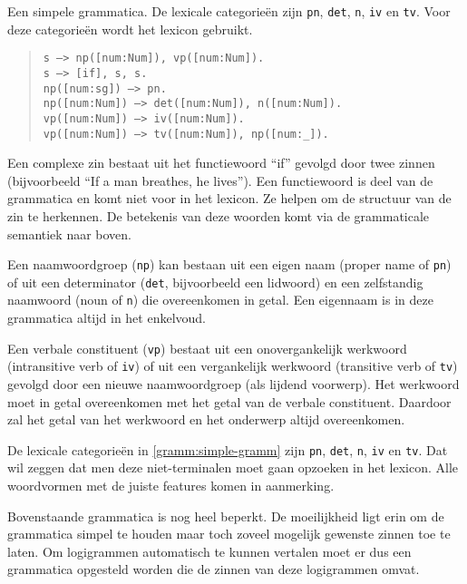 \begin{ex}
  Een simpele grammatica. De lexicale categorieën zijn \texttt{pn}, \texttt{det}, \texttt{n}, \texttt{iv} en \texttt{tv}. Voor deze categorieën wordt het lexicon gebruikt.
  \label{gramm:simple-gramm}
  \begin{quote}
    \texttt{s ---> np([num:Num]), vp([num:Num]).} \\
    \texttt{s ---> [if], s, s.} \\
    \texttt{np([num:sg]) ---> pn.} \\
    \texttt{np([num:Num]) ---> det([num:Num]), n([num:Num]).} \\
    \texttt{vp([num:Num]) ---> iv([num:Num]).} \\
    \texttt{vp([num:Num]) ---> tv([num:Num]), np([num:\_]).} \\
  \end{quote}
\end{ex} 

Een complexe zin bestaat uit het functiewoord ``if'' gevolgd door twee zinnen (bijvoorbeeld ``If a man breathes, he lives''). Een functiewoord is deel van de grammatica en komt niet voor in het lexicon. Ze helpen om de structuur van de zin te herkennen. De betekenis van deze woorden komt via de grammaticale semantiek naar boven.

Een naamwoordgroep (\texttt{np}) kan bestaan uit een eigen naam (proper name of \texttt{pn}) of uit een determinator (\texttt{det}, bijvoorbeeld een lidwoord) en een zelfstandig naamwoord (noun of \texttt{n}) die overeenkomen in getal. Een eigennaam is in deze grammatica altijd in het enkelvoud.

Een verbale constituent (\texttt{vp}) bestaat uit een onovergankelijk werkwoord (intransitive verb of \texttt{iv}) of uit een vergankelijk werkwoord (transitive verb of \texttt{tv}) gevolgd door een nieuwe naamwoordgroep (als lijdend voorwerp). Het werkwoord moet in getal overeenkomen met het getal van de verbale constituent. Daardoor zal het getal van het werkwoord en het onderwerp altijd overeenkomen.

De lexicale categorieën in \autoref{gramm:simple-gramm} zijn \texttt{pn}, \texttt{det}, \texttt{n}, \texttt{iv} en \texttt{tv}. Dat wil zeggen dat men deze niet-terminalen moet gaan opzoeken in het lexicon. Alle woordvormen met de juiste features komen in aanmerking.

Bovenstaande grammatica is nog heel beperkt. De moeilijkheid ligt erin om de grammatica simpel te houden maar toch zoveel mogelijk gewenste zinnen toe te laten. Om logigrammen automatisch te kunnen vertalen moet er dus een grammatica opgesteld worden die de zinnen van deze logigrammen omvat.

